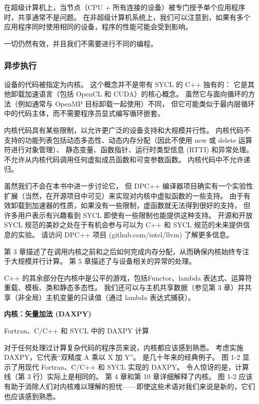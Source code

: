 在超级计算机上，当节点（CPU + 所有连接的设备）被专门授予单个应用程序时，共享通常不是问题。 
在非超级计算机系统上，我们可以注意到，如果有多个应用程序同时使用相同的设备，程序的性能可能会受到影响。

一切仍然有效，并且我们不需要进行不同的编程。

\subsubsection{异步执行}
设备的代码被指定为内核。 这个概念并不是带有 SYCL 的 C++ 独有的：
它是其他卸载加速语言（包括 OpenCL 和 CUDA）的核心概念。 
虽然它与面向循环的方法（例如通常与 OpenMP 目标卸载一起使用）不同，
但它可能类似于最内层循环中的代码主体，而不需要程序员显式编写循环嵌套。

内核代码具有某些限制，以允许更广泛的设备支持和大规模并行性。 
内核代码不支持的功能列表包括动态多态性、动态内存分配（因此不使用 new 或 delete 运算符进行对象管理）、
静态变量、函数指针、运行时类型信息 (RTTI) 和异常处理。 不允许从内核代码调用任何虚拟成员函数和可变参数函数。 
内核代码中不允许递归。

\begin{remark}[虚函数]
	虽然我们不会在本书中进一步讨论它，
	但 DPC++ 编译器项目确实有一个实验性扩展（当然，在开源项目中可见）来实现对内核中虚拟函数的一些支持。 
	由于有效卸载到加速器的性质，如果没有一些限制，虚函数就无法得到很好的支持，
	但许多用户表示有兴趣看到 SYCL 即使有一些限制也能提供这种支持。 
	开源和开放 SYCL 规范的美妙之处在于有机会参与可以为 C++ 和 SYCL 规范的未来提供信息的实验。 
	请访问 DPC++ 项目 (github.com/intel/llvm) 了解更多信息。
\end{remark}

第 3 章描述了在调用内核之前和之后如何完成内存分配，从而确保内核始终专注于大规模并行计算。 
第 5 章描述了与设备相关的异常的处理。

C++ 的其余部分在内核中是公平的游戏，包括Functor、lambda 表达式、运算符重载、模板、类和静态多态性。 
我们还可以与主机共享数据（参见第 3 章）并共享（非全局）主机变量的只读值（通过 lambda 表达式捕获）。

\textbf{内核：矢量加法 (DAXPY)}

{\color{red} Fortran、C/C++ 和 SYCL 中的 DAXPY 计算 }

对于任何处理过计算复杂代码的程序员来说，内核都应该感到熟悉。 
考虑实施 DAXPY，它代表“双精度 A 乘以 X 加 Y”。 是几十年来的经典例子。 
图 1-2 显示了用现代 Fortran、C/C++ 和 SYCL 实现的 DAXPY。 
令人惊讶的是，计算线（第 3 行）实际上是相同的。 第 4 章和第 10 章详细解释了内核。 
图 1-2 应该有助于消除人们对内核难以理解的担忧——即使这些术语对我们来说是新的，它们也应该感到熟悉。

